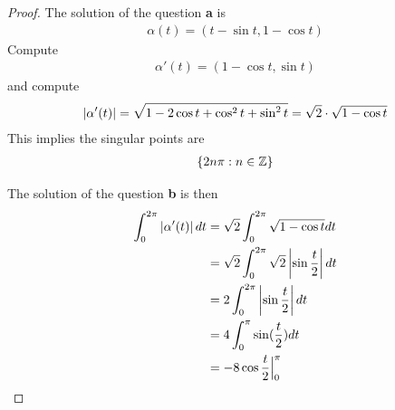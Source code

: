 \documentclass{report}
\begin{document}
\begin{proof}
The solution of the question \textbf{a} is 
\begin{align*}
\alpha (t)=(t-\sin t,1-\cos t)
\end{align*}
Compute 
\begin{align*}
\alpha'(t)=(1-\cos t,\sin t)
\end{align*}
and compute
\begin{align*}
\left|\alpha '(t)\right|=\sqrt{1-2\cos t +\cos^2 t +\sin^2 t}  = \sqrt{2}\cdot \sqrt{1-\cos t}  
\end{align*}
This implies the singular points are 
\begin{align*}
  \{ 2n\pi : n\in\mathbb{Z} \}
\end{align*}


The solution of the question \textbf{b} is then 
\begin{align*}
\int_0^{2\pi} \left|\alpha '(t)\right|dt&=\sqrt{2}\int_0^{2\pi} \sqrt{1-\cos t}dt \\
&=\sqrt{2} \int_{0}^{2\pi} \sqrt{2} \left|\sin \frac{t}{2}\right|dt  \\
&=2\int_0^{2\pi}\left|\sin \frac{t}{2}\right|dt\\
&=4 \int_{0}^{\pi}\sin (\frac{t}{2})dt\\
&=-8 \cos \frac{t}{2}\Big|_0^{\pi}
\end{align*}

\end{proof}
\end{document}
